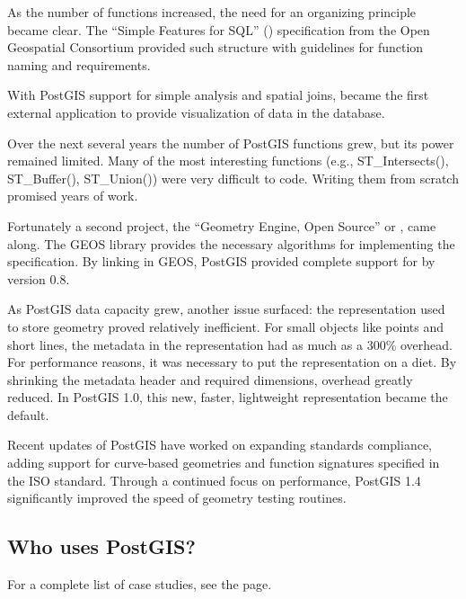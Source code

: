 \documentclass[a4paper,11pt,english]{sphinxmanual}
\begin{document}
As the number of functions increased, the need for an organizing principle became clear.  The “Simple Features for SQL” ({\hyperref[\detokenize{glossary:term-sfsql}]{}}) specification from the Open Geospatial Consortium provided such structure with guidelines for function naming and requirements.

With PostGIS support for simple analysis and spatial joins,  became the first external application to provide visualization of data in the database.

Over the next several years the number of PostGIS functions grew, but its power remained limited. Many of the most interesting functions (e.g., ST\_Intersects(), ST\_Buffer(), ST\_Union()) were very difficult to code.  Writing them from scratch promised years of work.

Fortunately a second project, the “Geometry Engine, Open Source” or , came along. The GEOS library provides the necessary algorithms for implementing the {\hyperref[\detokenize{glossary:term-sfsql}]{}} specification. By linking in GEOS, PostGIS provided complete support for {\hyperref[\detokenize{glossary:term-sfsql}]{}} by version 0.8.

As PostGIS data capacity grew, another issue surfaced: the representation used to store geometry proved relatively inefficient. For small objects like points and short lines, the metadata in the representation had as much as a 300\% overhead. For performance reasons, it was necessary to put the representation on a diet.  By shrinking the metadata header and required dimensions, overhead greatly reduced. In PostGIS 1.0, this new, faster, lightweight representation became the default.

Recent updates of PostGIS have worked on expanding standards compliance, adding support for curve-based geometries and function signatures specified in the ISO {\hyperref[\detokenize{glossary:term-sql-mm}]{}} standard. Through a continued focus on performance,  PostGIS 1.4 significantly improved the speed of geometry testing routines.


\subsection{Who uses PostGIS?}
\label{\detokenize{introduction:who-uses-postgis}}
For a complete list of case studies, see the  page.
\end{document}

